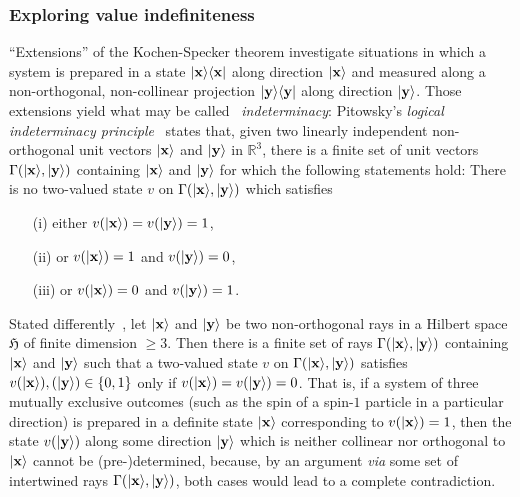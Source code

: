 \subsubsection{Exploring value indefiniteness}
\label{2017-b-c-eokst}

``Extensions'' of the Kochen-Specker theorem investigate situations
in which a system is prepared in a state
$\vert {\bf x} \rangle \langle {\bf x} \vert$  along direction
$\vert {\bf x} \rangle$
and measured along a non-orthogonal, non-collinear projection
$\vert {\bf y} \rangle \langle {\bf y} \vert$  along direction
$\vert {\bf y} \rangle$.
Those extensions yield what may be called~\cite{pitowsky:218,hru-pit-2003} {\em indeterminacy}:
Pitowsky's  {\em logical indeterminacy principle}~\cite[Theorem~6, p.~226]{pitowsky:218}
states that, given two linearly independent
non-orthogonal unit vectors
$\vert {\bf x} \rangle$
and
$\vert {\bf y} \rangle$
in $\mathbb{R}^3$,
there is a finite set of unit vectors
$\Gamma ( \vert {\bf x} \rangle , \vert {\bf y} \rangle )$ containing
$\vert {\bf x} \rangle$
and
$\vert {\bf y} \rangle$
for which the following statements hold:  There is no two-valued state $v$ on $\Gamma ( \vert {\bf x} \rangle , \vert {\bf y} \rangle )$ which
satisfies
\begin{enumerate}
\item[(i)]
either $v ( \vert {\bf x} \rangle ) = v ( \vert {\bf y} \rangle ) =1$,
\item[(ii)]
or $v ( \vert {\bf x} \rangle ) = 1$ and $ v ( \vert {\bf y} \rangle ) =0$,
\item[(iii)]
or $v ( \vert {\bf x} \rangle ) = 0$ and $ v ( \vert {\bf y} \rangle ) =1$.
\end{enumerate}

Stated differently~\cite[Theorem~2,p~183]{hru-pit-2003},
let $\vert {\bf x} \rangle$
and
$\vert {\bf y} \rangle$
be two non-orthogonal rays in a Hilbert space $\mathfrak{H}$ of finite
dimension $\ge 3$. Then there is a finite set of rays $\Gamma ( \vert {\bf x} \rangle , \vert {\bf y} \rangle )$ containing
$\vert {\bf x} \rangle$
and
$\vert {\bf y} \rangle$
such that a two-valued
state $v$ on $\Gamma ( \vert {\bf x} \rangle , \vert {\bf y} \rangle )$
satisfies $v ( \vert {\bf x} \rangle ),( \vert {\bf y} \rangle ) \in \{0,1\}$
only if $v ( \vert {\bf x} \rangle ) = v ( \vert {\bf y} \rangle ) =0$.
That is,
if a system of three mutually exclusive outcomes (such as the spin of a spin-$1$ particle in a particular direction)
is prepared in a definite state $\vert {\bf x} \rangle$  corresponding to $v(\vert {\bf x} \rangle )=1$,
then the state $ v ( \vert {\bf y} \rangle ) $ along  some direction $\vert {\bf y} \rangle $ which is neither collinear nor orthogonal
to  $\vert {\bf x} \rangle$
cannot be (pre-)determined,
because, by an argument {\it via} some set of intertwined rays  $\Gamma ( \vert {\bf x} \rangle , \vert {\bf y} \rangle )$,
both cases would lead to a complete contradiction.

